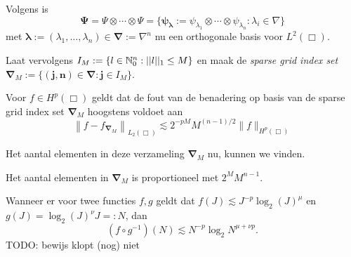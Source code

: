 Volgens \cite[L3.1.7]{tammo} is 
\[ 
  \boldsymbol\Psi = \Psi \otimes \cdots \otimes \Psi = \{ \boldsymbol{\psi_\lambda} := \psi_{\lambda_1} \otimes \cdots \otimes \psi_{\lambda_n}: \lambda_i \in \nabla \}
\]
met $\boldsymbol\lambda := (\lambda_1, \ldots, \lambda_n) \in \boldsymbol{\nabla} := \nabla^n$ nu een orthogonale basis voor $L^2(\Box)$.

Laat vervolgens $I_M := \{ l \in \mathbb{N}^n_0: ||l||_1 \leq M \}$ en maak de \emph{sparse grid index set} $\boldsymbol{\nabla}_M := \{ \boldsymbol{(j,n)} \in \boldsymbol{\nabla}: \boldsymbol{j} \in I_M \}$.

\begin{lemm}{\cite[P3.2.3]{tammo}}
  Voor $f \in H^p(\Box)$ geldt dat de fout van de benadering op basis van de sparse grid index set $\boldsymbol{\nabla}_M$ hoogstens voldoet aan
  \[
  \left\| f - f_{\boldsymbol\nabla_M} \right\|_{L_2(\Box)} \lesssim 2^{-pM} M^{(n-1)/2} \| f \|_{H^p(\Box)}
  \]
\end{lemm}

Het aantal elementen in deze verzameling $\boldsymbol{\nabla}_M$ nu, kunnen we vinden.
\begin{lemm}{\cite[L3.3.1]{tammo}}
  Het aantal elementen in $\boldsymbol{\nabla}_M$ is proportioneel met $2^M M^{n-1}$.
\end{lemm}

\begin{lemm}
  Wanneer er voor twee functies $f, g$ geldt dat $f(J) \lesssim J^{-p}\log_2(J)^\mu$ en $g(J) = \log_2(J)^\nu J =: N$, dan
  \[
  (f \circ g^{-1})(N) \lesssim N^{-p} \log_2{N}^{\mu + \nu p}.
  \]
  TODO: bewijs klopt (nog) niet
\end{lemm}

